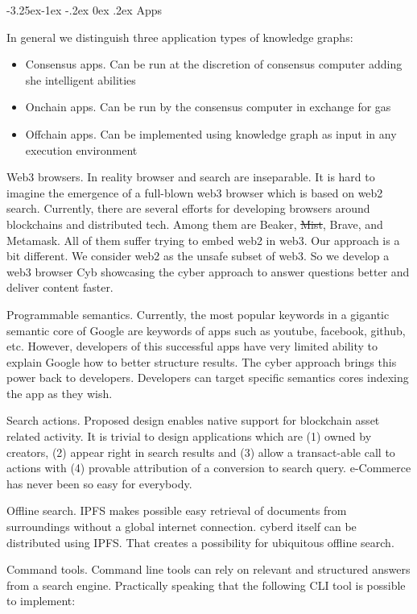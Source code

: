 \documentclass[8pt,oneside]{amsart}
\makeatletter
\renewcommand\subsection{\@startsection{subsection}{2}{\z@}%
                                     {-3.25ex\@plus -1ex \@minus -.2ex}%
                                     {0ex \@plus .2ex}%
                                     {\play\Large}}%
\newcommand{\titleSection}[1]{\subsection{#1}}
\newcommand{\code}[1]{{\PlayBold #1}}
\makeatother
\begin{document}
\titleSection{Apps}\label{Applications of knowledge graph}

In general we distinguish three application types of knowledge graphs:
\begin{itemize}
\item Consensus apps. Can be run at the discretion of consensus computer adding she intelligent abilities
\item Onchain apps. Can be run by the consensus computer in exchange for gas
\item Offchain apps. Can be implemented using knowledge graph as input in any execution environment
\end{itemize}

\code{Web3 browsers}. In reality browser and search are inseparable. It is hard to imagine the emergence of a full-blown web3 browser which is based on web2 search. Currently, there are several efforts for developing browsers around blockchains and distributed tech. Among them are Beaker, \sout{Mist}, Brave, and Metamask. All of them suffer trying to embed web2 in web3. Our approach is a bit different. We consider web2 as the unsafe subset of web3. So we develop a web3 browser Cyb showcasing the cyber approach to answer questions better and deliver content faster.

\code{Programmable semantics}. Currently, the most popular keywords in a gigantic semantic core of Google are keywords of apps such as youtube, facebook, github, etc. However, developers of this successful apps have very limited ability to explain Google how to better structure results. The cyber approach brings this power back to developers. Developers can target specific semantics cores indexing the app as they wish.

\code{Search actions}. Proposed design enables native support for blockchain asset related activity. It is trivial to design applications which are (1) owned by creators, (2) appear right in search results and (3) allow a transact-able call to actions with (4) provable attribution of a conversion to search query. e-Commerce has never been so easy for everybody.

\code{Offline search}. IPFS makes possible easy retrieval of documents from surroundings without a global internet connection. cyberd itself can be distributed using IPFS. That creates a possibility for ubiquitous offline search.

\code{Command tools}. Command line tools can rely on relevant and structured answers from a search engine. Practically speaking that the following CLI tool is possible to implement:
\end{document}
